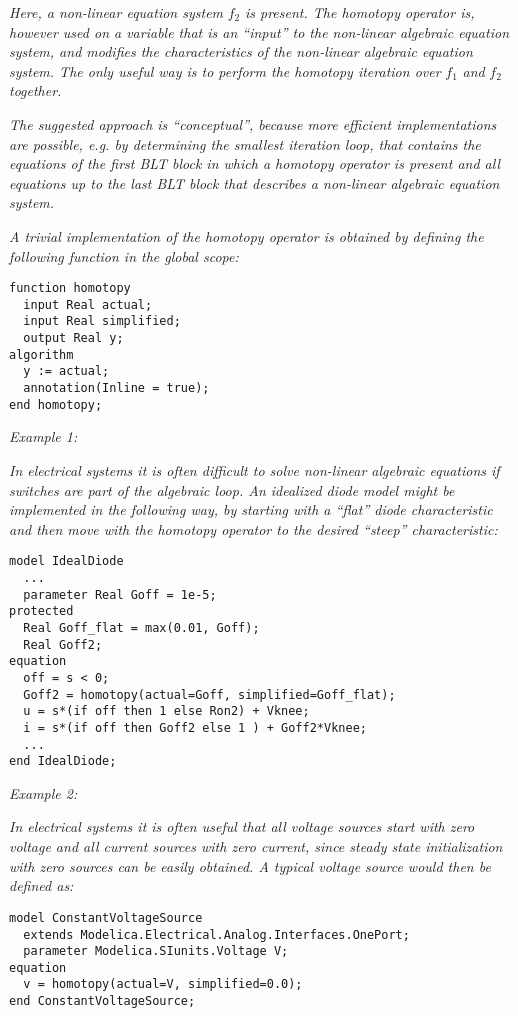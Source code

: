 \emph{Here, a non-linear equation system} $f_2$
\emph{is present. The homotopy operator is, however used on a variable
that is an ``input'' to the non-linear algebraic equation system, and
modifies the characteristics of the non-linear algebraic equation
system. The only useful way is to perform the homotopy iteration over}
$f_1$ \emph{and} $f_2$
\emph{together.}

\emph{The suggested approach is ``conceptual'', because more efficient
implementations are possible, e.g. by determining the smallest iteration
loop, that contains the equations of the first BLT block in which a
homotopy operator is present and all equations up to the last BLT block
that describes a non-linear algebraic equation system.}

\emph{A trivial implementation of the homotopy operator is obtained by
defining the following function in the global scope:}

\begin{lstlisting}[language=modelica]
function homotopy
  input Real actual;
  input Real simplified;
  output Real y;
algorithm
  y := actual;
  annotation(Inline = true);
end homotopy;
\end{lstlisting}

\emph{Example 1:}

\emph{In electrical systems it is often difficult to solve non-linear
algebraic equations if switches are part of the algebraic loop. An
idealized diode model might be implemented in the following way, by
starting with a ``flat'' diode characteristic and then move with the
homotopy operator to the desired ``steep'' characteristic:}

\begin{lstlisting}[language=modelica]
model IdealDiode
  ...
  parameter Real Goff = 1e-5;
protected
  Real Goff_flat = max(0.01, Goff);
  Real Goff2;
equation
  off = s < 0;
  Goff2 = homotopy(actual=Goff, simplified=Goff_flat);
  u = s*(if off then 1 else Ron2) + Vknee;
  i = s*(if off then Goff2 else 1 ) + Goff2*Vknee;
  ...
end IdealDiode;
\end{lstlisting}

\emph{Example 2:}

\emph{In electrical systems it is often useful that all voltage sources
start with zero voltage and all current sources with zero current, since
steady state initialization with zero sources can be easily obtained. A
typical voltage source would then be defined as:}

\begin{lstlisting}[language=modelica]
model ConstantVoltageSource
  extends Modelica.Electrical.Analog.Interfaces.OnePort;
  parameter Modelica.SIunits.Voltage V;
equation
  v = homotopy(actual=V, simplified=0.0);
end ConstantVoltageSource;
\end{lstlisting}

